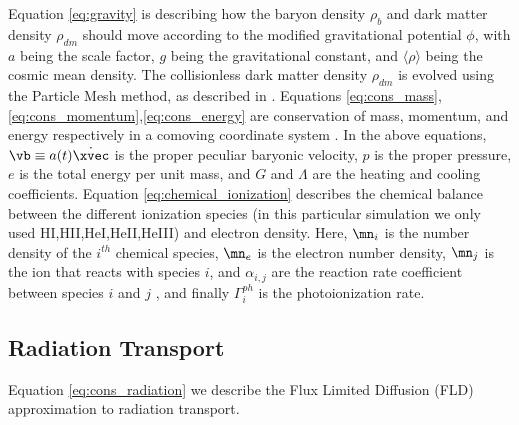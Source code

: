 Equation \ref{eq:gravity} is describing how the baryon density $\rho_b$ and dark matter density $\rho_{dm}$ should move according to the modified gravitational potential $\phi$, with $a$ being the scale factor, $g$ being the gravitational constant, and $\langle \rho \rangle$ being the cosmic mean density.  The collisionless dark matter density $\rho_{dm}$ is evolved using the Particle
Mesh method, as described in \citep{HockneyEastwood1988, NormanBryan1999, OSheaEtAl2004}. Equations \ref{eq:cons_mass},\ref{eq:cons_momentum},\ref{eq:cons_energy} are conservation of mass, momentum, and energy respectively in a comoving coordinate system \citep{BryanEtAl1995}.  In the above equations, $\vb\equiv a(t)\dot{\xvec}$ is the proper peculiar baryonic velocity, $p$ is the proper pressure, $e$ is the total energy per unit mass, and $G$ and $\Lambda$ are the heating and cooling coefficients.  Equation \ref{eq:chemical_ionization} describes the chemical balance between the different ionization species (in this particular simulation we only used H{\footnotesize I},H{\footnotesize II},He{\footnotesize I},He{\footnotesize II},He{\footnotesize III}) and electron density.  Here, $\mn_i$ is the number density of the $i^{th}$ chemical species, $\mn_e$ is the electron number density, $\mn_j$ is the ion that reacts with species $i$, and $\alpha_{i,j}$ are the reaction rate coefficient between species $i$ and $j$ \citep{AbelEtAl1997, HuiGnedin1997}, and finally $\Gamma^{ph}_i$ is the photoionization rate.

\subsection{Radiation Transport}

Equation \ref{eq:cons_radiation} we describe the Flux Limited Diffusion (FLD) approximation to radiation transport.  